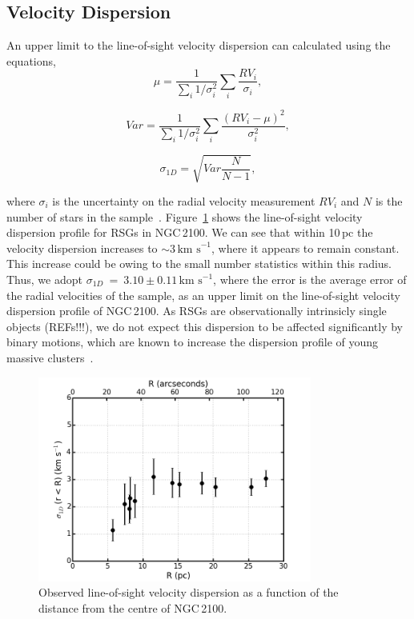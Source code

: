 \documentclass[useAMS,usenatbib]{mn2e}
\def\kms{$\mbox{km s}^{-1}$}
\begin{document}
\subsection{Velocity Dispersion} %
\label{sub:velocity_dispersion}

An upper limit to the line-of-sight velocity dispersion can calculated using the equations,
\begin{equation}
  \mu = \frac{1}{\sum_{i} 1/\sigma_{i}^{2}} \sum_{i} \frac{RV_{i}}{\sigma_{i}},
\end{equation}

\begin{equation}
Var = \frac{1}{\sum_{i}1/\sigma_{i}^{2}} \sum_{i}\frac{(RV_{i} - \mu)^{2}}{\sigma_{i}^{2}},
\end{equation}

\begin{equation}
  \sigma_{1D} = \sqrt{Var \frac{N}{N - 1}},
\end{equation}

\noindent where $\sigma_{i}$ is the uncertainty on the radial velocity measurement $RV_{i}$ and $N$ is the number of stars in the sample~\citep[and references therin]{2012A&A...546A..73H}.
Figure~\ref{fig:sig1d} shows the line-of-sight velocity dispersion profile for RSGs in NGC\,2100.
We can see that within 10\,pc the velocity dispersion increases to $\sim$3\,\kms, where it appears to remain constant.
This increase could be owing to the small number statistics within this radius.
Thus, we adopt $\sigma_{1D}~=~3.10\pm0.11\,$\kms, where the error is the average error of the radial velocities of the sample, as an upper limit on the line-of-sight velocity dispersion profile of NGC\,2100.
As RSGs are observationally intrinsicly single objects (REFs!!!), we do not expect this dispersion to be affected significantly by binary motions, which are known to increase the dispersion profile of young massive clusters~\citep{2010MNRAS.402.1750G,2012A&A...546A..73H}.



\begin{figure}
 \includegraphics[width=9.0cm]{NGC2100-sig1d}
 \caption{Observed line-of-sight velocity dispersion as a function of the distance from the centre of NGC\,2100.
\label{fig:sig1d}
          }
\end{figure}
\end{document}
